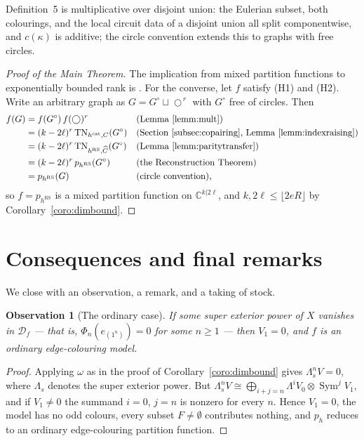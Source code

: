 \documentclass[11pt]{article}
\newtheorem{obse}[theo]{Observation}
\newcommand{\freecircle}{\bigcirc}
\newcommand{\cauchy}{\mathcal{D}_{f}}             %
\newcommand{\genX}{X}                             %
\newcommand{\fib}{\omega}                         %
\newcommand{\copair}{C}                           %
\newcommand{\twistedC}{\widehat{C}}               %
\newcommand{\SymV}{\operatorname{Sym}}
\begin{document}
Definition~5 is multiplicative over disjoint union: the Eulerian
subset, both colourings, and the local circuit data of a disjoint
union all split componentwise, and $c(\kappa)$ is additive; the
circle convention extends this to graphs with free circles.

\begin{proof}[Proof of the Main Theorem]
The implication from mixed partition functions to exponentially
bounded rank is \cite[Theorem~6]{RS21}. For the converse, let $f$
satisfy (H1) and (H2). Write an arbitrary graph
as $G=G^{\circ}\sqcup\freecircle^{\,r}$ with $G^{\circ}$ free of
circles. Then
\begin{align*}
f(G)&=f(G^{\circ})\,f(\freecircle)^{r}
&&\text{(Lemma~\ref{lemm:mult})}\\
&=(k-2\ell)^{r}\,
\mathrm{TN}_{h^{\mathrm{cat}},\copair}(G^{\circ})
&&\text{(Section~\ref{subsec:copairing},
Lemma~\ref{lemm:indexraising})}\\
&=(k-2\ell)^{r}\,
\mathrm{TN}_{h^{\mathrm{RS}},\twistedC}(G^{\circ})
&&\text{(Lemma~\ref{lemm:paritytransfer})}\\
&=(k-2\ell)^{r}\,p_{h^{\mathrm{RS}}}(G^{\circ})
&&\text{(the Reconstruction Theorem)}\\
&=p_{h^{\mathrm{RS}}}(G)
&&\text{(circle convention),}
\end{align*}
so $f=p_{h^{\mathrm{RS}}}$ is a mixed partition function on
$\mathbb{C}^{k|2\ell}$, and $k,2\ell\le\lfloor 2eR\rfloor$ by
Corollary~\ref{coro:dimbound}.
\end{proof}

\section{Consequences and final remarks}\label{sec:consequences}

We close with an observation, a remark, and a taking of stock.

\begin{obse}[The ordinary case]\label{obse:ordinary}
If some super exterior power of $\genX$ vanishes in $\cauchy$ ---
that is, $\Phi_{n}(e_{(1^{n})})=0$ for some $n\ge1$ --- then
$V_{1}=0$, and $f$ is an ordinary edge-colouring model.
\end{obse}

\begin{proof}
Applying $\fib$ as in the proof of
Corollary~\ref{coro:dimbound} gives $\Lambda_{s}^{n}V=0$, where
$\Lambda_{s}$ denotes the super exterior power. But
$\Lambda_{s}^{n}V\cong\bigoplus_{i+j=n}\Lambda^{i}V_{0}\otimes
\SymV^{j}V_{1}$, and if $V_{1}\ne0$ the summand $i=0$, $j=n$ is
nonzero for every $n$. Hence $V_{1}=0$, the model has no odd
colours, every subset $F\ne\emptyset$ contributes nothing, and
$p_{h}$ reduces to an ordinary edge-colouring partition
function.
\end{proof}
\end{document}
